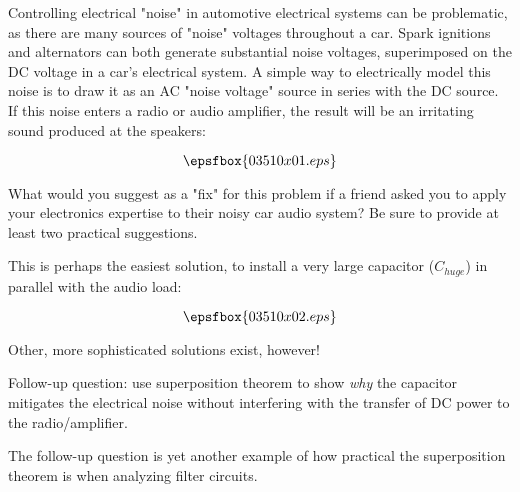 

Controlling electrical "noise" in automotive electrical systems can be problematic, as there are many sources of "noise" voltages throughout a car.  Spark ignitions and alternators can both generate substantial noise voltages, superimposed on the DC voltage in a car's electrical system.  A simple way to electrically model this noise is to draw it as an AC "noise voltage" source in series with the DC source.  If this noise enters a radio or audio amplifier, the result will be an irritating sound produced at the speakers:

$$\epsfbox{03510x01.eps}$$

What would you suggest as a "fix" for this problem if a friend asked you to apply your electronics expertise to their noisy car audio system?  Be sure to provide at least two practical suggestions.







This is perhaps the easiest solution, to install a very large capacitor ($C_{huge}$) in parallel with the audio load:

$$\epsfbox{03510x02.eps}$$

Other, more sophisticated solutions exist, however!

\vskip 10pt

Follow-up question: use superposition theorem to show {\it why} the capacitor mitigates the electrical noise without interfering with the transfer of DC power to the radio/amplifier.







The follow-up question is yet another example of how practical the superposition theorem is when analyzing filter circuits.




